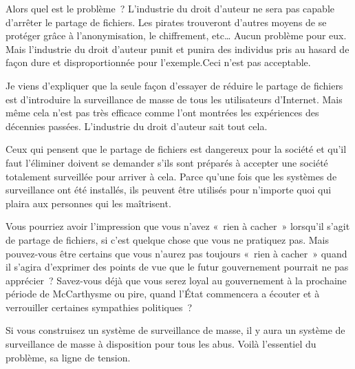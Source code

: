 Alors quel est le problème~? L’industrie du droit d’auteur ne sera pas capable d’arrêter le partage
de fichiers. Les pirates trouveront d’autres moyens de se protéger grâce à l’anonymisation, le
chiffrement, etc… Aucun problème pour eux. Mais l’industrie du droit d’auteur
punit et punira des
individus pris au hasard de façon dure et disproportionnée pour l’exemple.Ceci n’est pas acceptable. 

Je viens d'expliquer que la seule façon d’essayer de réduire le partage de fichiers est d’introduire la surveillance de masse
de tous les utilisateurs d’Internet. Mais même cela n’est pas très efficace comme l’ont montrées
les expériences des décennies passées. L’industrie du droit d’auteur sait tout cela.

Ceux qui pensent que le partage de fichiers est dangereux pour la société et qu’il faut
l’éliminer doivent se demander s’ils sont préparés à accepter une société totalement surveillée pour
arriver à cela. Parce qu’une fois que les systèmes de surveillance ont été installés, ils peuvent
être utilisés pour n’importe quoi qui plaira aux personnes qui les maîtrisent.

Vous pourriez avoir l’impression que vous n’avez «~rien à cacher~» lorsqu’il s’agit de partage
de fichiers, si c’est quelque chose que vous ne pratiquez pas. Mais pouvez-vous être certains que
vous n’aurez pas toujours «~rien à cacher~» quand il s’agira d’exprimer des points de vue que le futur
gouvernement pourrait ne pas apprécier~? Savez-vous déjà que vous serez loyal au gouvernement à la
prochaine période de McCarthysme ou pire, quand l’État commencera a écouter et à verrouiller
certaines sympathies politiques~?

Si vous construisez un système de surveillance de masse, il y aura un système de surveillance de
masse à disposition pour tous les abus. Voilà l’essentiel du problème, sa ligne de tension.

